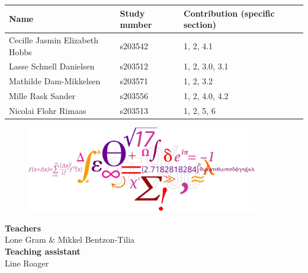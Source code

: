 \begin{titlepage}
\begin{center}
\begin{table}[h!]
\centering
\begin{tabular}{|l|l|l|}
\hline
\textbf{Name }                          & \textbf{Study number} & \textbf{Contribution (specific section)} \\ \hline
Cecille Jasmin Elizabeth Hobbs & s203542      & 1, 2, 4.1                     \\ \hline
Lasse Schnell Danielsen        & s203512      & 1, 2, 3.0, 3.1                  \\ \hline
Mathilde Dam-Mikkelsen         & s203571      & 1, 2, 3.2                    \\ \hline
Mille Rask Sander              & s203556      & 1, 2, 4.0, 4.2                 \\ \hline
Nicolai Flohr Rimaas           & s203513      & 1, 2, 5, 6                     \\ \hline
\end{tabular}
\end{table}
        \vspace{0.8 cm}
        \begin{figure}[h!]
            \centering
            \includegraphics[width=0.9\textwidth]{Figures/Picture 1.jpg}
        \end{figure}
        \textbf{Teachers}\\
        Lone Gram \& Mikkel Bentzon-Tilia\\ 
        \textbf{Teaching assistant}\\
        Line Roager
        \vfill
    \end{center}  
\end{titlepage}